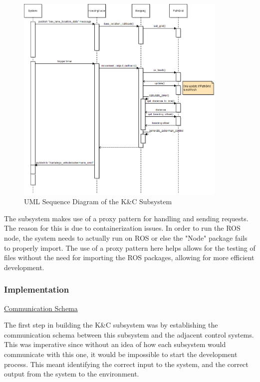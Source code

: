 \documentclass[titlepage,draft]{article}
\begin{document}
{\begin{figure}
	\centering
	\includegraphics[width=0.9\textwidth]{KnC_sequence.png}
	\caption{UML Sequence Diagram of the K\&C Subsystem}
	\label{fig:control_sequence}
\end{figure}

The subsystem makes use of a proxy pattern for handling and sending requests. The reason for this is due to containerization issues. In order to run the ROS node, the system needs to actually run on ROS or else the "Node" package fails to properly import. The use of a proxy pattern here helps allows for the testing of files without the need for importing the ROS packages, allowing for more efficient development.


\subsubsection{Implementation}
\underline{Communication Schema}

The first step in building the K\&C subsystem was by establishing the communication schema between this subsystem and the adjacent control systems. This was imperative since without an idea of how each subsystem would communicate with this one, it would be impossible to start the development process. This meant identifying the correct input to the system, and the correct output from the system to the environment.

}
\end{document}
